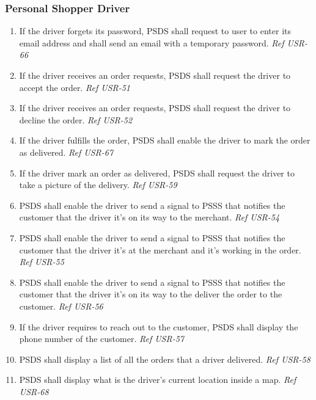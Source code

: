 \pagebreak

\subsubsection{Personal Shopper Driver}
\begin{enumerate}[resume, label=SY-\arabic*]
    \item  If the driver forgets its password, PSDS shall request to user to 
    enter its email address and shall send an email with a temporary password.
    \newline \textit{Ref USR-66} 
    \item  If the driver receives an order requests, PSDS shall request the 
    driver to accept the order.
    \newline \textit{Ref USR-51} 
    \item  If the driver receives an order requests, PSDS shall request the 
    driver to decline the order.
    \newline \textit{Ref USR-52} 
    \item  If the driver fulfills the order, PSDS shall enable the driver to 
    mark the order as delivered.
	\newline \textit{Ref USR-67} 
    \item  If the driver mark an order as delivered, PSDS shall request the 
    driver to take a picture of the delivery.
    \newline \textit{Ref USR-59} 
    \item  PSDS shall enable the driver to send a signal to PSSS that notifies 
    the customer that the driver it's on its way to the merchant.
    \newline \textit{Ref USR-54} 
    \item  PSDS shall enable the driver to send a signal to PSSS that notifies 
    the customer that the driver it's at the merchant and it's working 
    in the order.
    \newline \textit{Ref USR-55} 
    \item  PSDS shall enable the driver to send a signal to PSSS that notifies 
    the customer that the driver it's on its way to the deliver the order to 
    the customer.
    \newline \textit{Ref USR-56} 
    \item  If the driver requires to reach out to the customer, PSDS shall 
    display the phone number of the customer.
    \newline \textit{Ref USR-57} 
    \item  PSDS shall display a list of all the orders that a driver delivered.
    \newline \textit{Ref USR-58} 
    \item  PSDS shall display what is the driver's current location 
    inside a map.
    \newline \textit{Ref USR-68} 
\end{enumerate}

